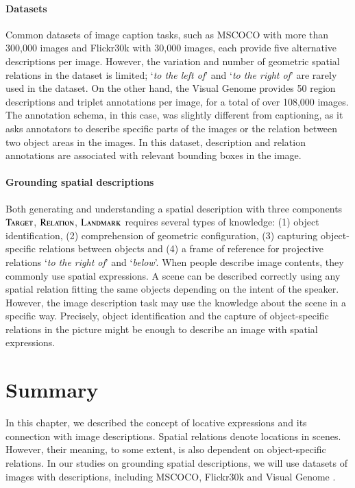 \paragraph{Datasets}
Common datasets of image caption tasks, such as MSCOCO  \citep{lin2014microsoft} with more than 300,000 images and Flickr30k  \citep{flickr30k} with 30,000 images, each provide five alternative descriptions per image. 
However, the variation and number of geometric spatial relations in the dataset is limited;
`\emph{to the left of}' and `\emph{to the right of}' are rarely used in the dataset. 
On the other hand, the Visual Genome \citep{krishna2017visual} provides 50 region descriptions and triplet annotations per image, for a total of over 108,000 images. 
The annotation schema, in this case, was slightly different from captioning, as it asks annotators to describe specific parts of the images or the relation between two object areas in the images. 
In this dataset, description and relation annotations are associated with relevant bounding boxes in the image.


\paragraph{Grounding spatial descriptions}
Both generating and understanding a spatial description with three components \textemdash  $\textsc{Target}$, $\textsc{Relation}$, $\textsc{Landmark}$ \textemdash  requires several types of knowledge:
 (1) object identification,
 (2) comprehension of geometric configuration,
 (3) capturing object-specific relations between objects and 
 (4) a frame of reference for projective relations `\emph{to the right of}' and `\emph{below}'.
When people describe image contents, they commonly use spatial expressions. 
A scene can be described correctly using any spatial relation fitting the same objects depending on the intent of the speaker.
However, the image description task may use the knowledge about the scene in a specific way.%
Precisely, object identification and the capture of object-specific relations in the picture might be enough to describe an image with spatial expressions.

\section{Summary}
\label{sec:spatial:summary}
In this chapter, we described the concept of locative expressions and its connection with image descriptions. 
Spatial relations denote locations in scenes. However, their meaning, to some extent, is also dependent on object-specific relations. 
In our studies on grounding spatial descriptions, we will use datasets of images with descriptions, including MSCOCO\citep{lin2014microsoft}, Flickr30k\citep{flickr30k} and Visual Genome \citep{krishna2017visual}.